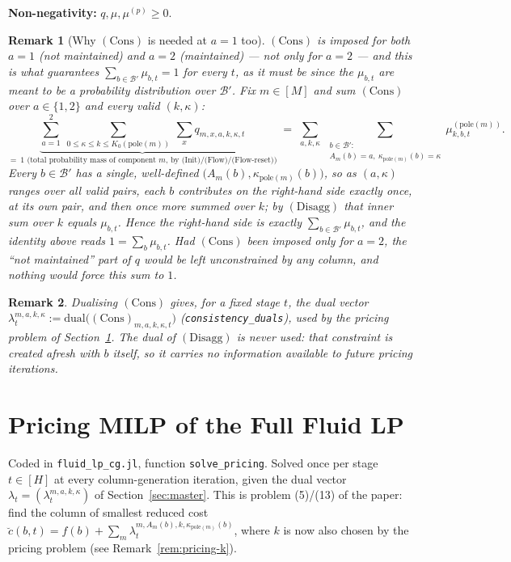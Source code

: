 \documentclass[11pt]{article}
\newtheorem{remark}{Remark}
\newcommand{\pole}{\mathrm{pole}}
\begin{document}
\textbf{Non-negativity:} $q,\mu,\mu^{(p)} \ge 0$.

\begin{remark}[Why $(\mathrm{Cons})$ is needed at $a=1$ too]
\label{rem:sum-to-one}
$(\mathrm{Cons})$ is imposed for \emph{both} $a=1$ (not maintained) and $a=2$ (maintained)
--- not only for $a=2$ --- and this is what guarantees $\sum_{b \in \mathcal B'} \mu_{b,t}=1$
for every $t$, as it must be since the $\mu_{b,t}$ are meant to be a probability
distribution over $\mathcal B'$. Fix $m \in [M]$ and sum $(\mathrm{Cons})$ over
$a \in \{1,2\}$ and every valid $(k,\kappa)$:
\[
  \underbrace{\sum_{a=1}^2\ \sum_{0 \le \kappa \le k \le K_0(\pole(m))}\ \sum_{x} q_{m,x,a,k,\kappa,t}}_{=\ 1
  \text{ (total probability mass of component } m \text{, by (Init)/(Flow)/(Flow-reset))}}
  \;=\;
  \sum_{a,k,\kappa}\ \sum_{\substack{b \in \mathcal B':\\ A_m(b)=a,\ \kappa_{\pole(m)}(b)=\kappa}} \mu^{(\pole(m))}_{k,b,t}.
\]
Every $b \in \mathcal B'$ has a single, well-defined $\bigl(A_m(b), \kappa_{\pole(m)}(b)\bigr)$,
so as $(a,\kappa)$ ranges over all valid pairs, each $b$ contributes on the right-hand side
exactly once, at its own pair, and then once more summed over $k$; by $(\mathrm{Disagg})$
that inner sum over $k$ equals $\mu_{b,t}$. Hence the right-hand side is exactly
$\sum_{b \in \mathcal B'} \mu_{b,t}$, and the identity above reads $1 = \sum_b \mu_{b,t}$.
Had $(\mathrm{Cons})$ been imposed only for $a=2$, the ``not maintained'' part of $q$ would
be left unconstrained by any column, and nothing would force this sum to $1$.
\end{remark}

\begin{remark}
Dualising $(\mathrm{Cons})$ gives, for a fixed stage $t$, the dual vector
$\lambda_t^{m,a,k,\kappa} := \mathrm{dual}\bigl((\mathrm{Cons})_{m,a,k,\kappa,t}\bigr)$
(\texttt{consistency\_duals}), used by the pricing problem of Section~\ref{sec:pricing}.
The dual of $(\mathrm{Disagg})$ is never used: that constraint is created afresh with $b$
itself, so it carries no information available to future pricing iterations.
\end{remark}

\section{Pricing MILP of the Full Fluid LP}
\label{sec:pricing}

Coded in \texttt{fluid\_lp\_cg.jl}, function \texttt{solve\_pricing}. Solved once per
stage $t \in [H]$ at every column-generation iteration, given the dual vector
$\lambda_t = (\lambda_t^{m,a,k,\kappa})$ of Section~\ref{sec:master}. This is problem
(5)/(13) of the paper: find the column of smallest reduced cost
$\breve c(b,t) = f(b) + \sum_{m} \lambda_t^{m,A_m(b),k,\kappa_{\pole(m)}(b)}$, where $k$ is
now also chosen by the pricing problem (see Remark~\ref{rem:pricing-k}).
\end{document}
